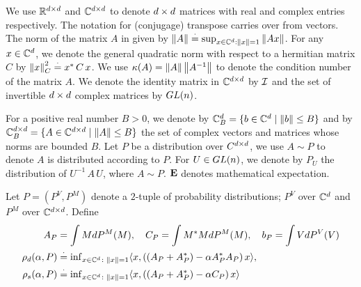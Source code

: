 We use $\mathbb{R}^{d \times d}$ and $\mathbb{C}^{d \times d}$ to denote $d \times d$ matrices with real and complex entries respectively. The notation for (conjugage) transpose carries over from vectors.
The norm of the matrix $A$ in given by $\left\| A\right\|\stackrel{\cdot}{=} \sup_{x\in \mathbb{C}^d:\left\| x\right\|=1} \left\| Ax\right\|$. For any $x\in\mathbb{C}^d$, we denote the general quadratic norm with respect to a hermitian matrix $C$ by $\left\| x\right\|^2_C\stackrel{\cdot}{=} x^*\, C \,x$. We use $\kappa(A)=\left\| A\right\|\left\| A^{-1}\right\|$ to denote the condition number of the matrix $A$. We denote the identity matrix in $\mathbb{C}^{d \times d}$ by $\mathcal{I}$ and the set of invertible $d \times d$ complex matrices by $GL(n)$.
\begin{comment}
We use $A\succeq 0$ to denote that the
square matrix $A$ is hermitian and positive semidefinite (HPD):
$A = A^*$, $\inf_x x^* A x\ge 0$.
For $A,B$ HPD matrices, $A\succeq B$ holds if $A-B\succeq 0$.
We also use $A\succ B$ similarly to denote that $A-B \succ 0$.
We also use $\preceq$ and $\prec$ analogously.
\end{comment}
For a positive real number $B>0$, we denote by $\mathbb{C}^{d}_B=\{b\in \mathbb{C}^d\mid \left\| b\right\|\leq B\}$ and by $\mathbb{C}^{d \times d}_B=\{A\in \mathbb{C}^{d \times d}\mid \left\| A\right\|\leq B\}$ the set of complex vectors and matrices whose norms are bounded $B$.
Let $P$ be a distribution over $C^{d \times d}$, we use $A\sim P$ to denote $A$ is distributed according to $P$. For $U\in GL(n)$, we denote by $P_U$ the distribution of $U^{-1}\,A\,U$, where $A\sim P$. $\mathbf{E}$ denotes mathematical expectation.
\begin{comment}
 We use $A\sim P$ to denote the fact that the random variable $A$ is distributed according to distribution $P$. Let the random matrix $A\sim P$, and $U\in \gln$, we use $P_U$ to denote the distribution of the random matrix $U^{-1}A U$.
\end{comment}
\begin{definition}\label{def:dist}
Let $P=(P^V,P^M)$ denote a $2$-tuple of probability distributions; $P^V$ over $\mathbb{C}^{d}$ and $P^M$ over $\mathbb{C}^{d \times d}$. Define
\begin{align*}
A_P&=\int M dP^M(M),\quad C_P=\int M^* M dP^M(M), \quad b_P=\int V dP^V(V)\\
\rho_d(\alpha,P)&\stackrel{\cdot}{=} {\inf}_{x\in\mathbb{C}^d\colon\left\| x\right\|=1}\langle x,\left((A_P+A_P^*)-\alpha A_P^* A_P\right)x\rangle,\\ \rho_s(\alpha,P)&\stackrel{\cdot}{=}{\inf}_{x\in \mathbb{C}^d\colon\left\| x\right\|=1}\langle x,\left((A_P+A_P^*)-\alpha C_P\right)x\rangle
\end{align*}
\end{definition}
